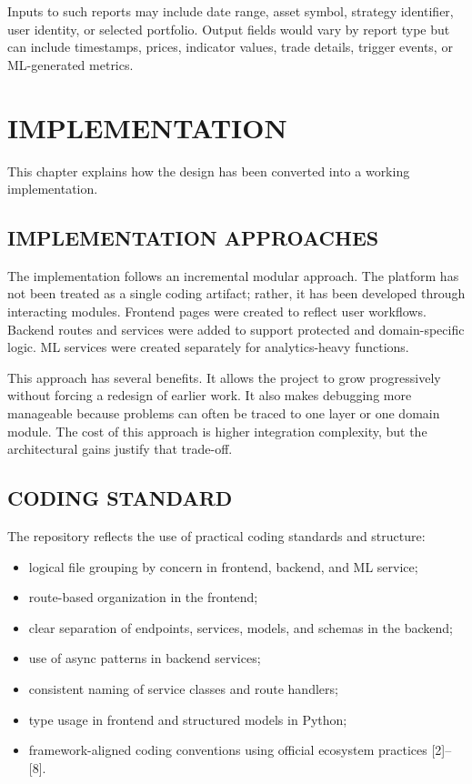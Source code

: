 \documentclass[12pt,a4paper]{report}
\begin{document}
Inputs to such reports may include date range, asset symbol, strategy identifier, user identity, or selected portfolio. Output fields would vary by report type but can include timestamps, prices, indicator values, trade details, trigger events, or ML-generated metrics.

\chapter{IMPLEMENTATION}
This chapter explains how the design has been converted into a working implementation.

\section{IMPLEMENTATION APPROACHES}
The implementation follows an incremental modular approach. The platform has not been treated as a single coding artifact; rather, it has been developed through interacting modules. Frontend pages were created to reflect user workflows. Backend routes and services were added to support protected and domain-specific logic. ML services were created separately for analytics-heavy functions.

This approach has several benefits. It allows the project to grow progressively without forcing a redesign of earlier work. It also makes debugging more manageable because problems can often be traced to one layer or one domain module. The cost of this approach is higher integration complexity, but the architectural gains justify that trade-off.

\section{CODING STANDARD}
The repository reflects the use of practical coding standards and structure:
\begin{itemize}
\item logical file grouping by concern in frontend, backend, and ML service;
\item route-based organization in the frontend;
\item clear separation of endpoints, services, models, and schemas in the backend;
\item use of async patterns in backend services;
\item consistent naming of service classes and route handlers;
\item type usage in frontend and structured models in Python;
\item framework-aligned coding conventions using official ecosystem practices [2]--[8].
\end{itemize}
\end{document}

